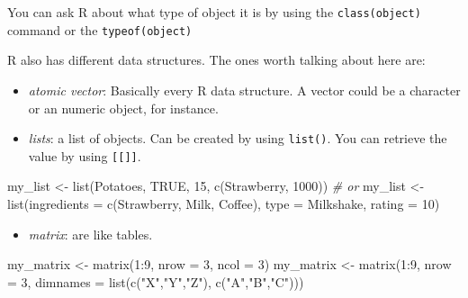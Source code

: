 \documentclass[
]{book}
\newenvironment{Shaded}{\begin{snugshade}}{\end{snugshade}}
\newcommand{\AttributeTok}[1]{\textcolor[rgb]{0.77,0.63,0.00}{#1}}
\newcommand{\CommentTok}[1]{\textcolor[rgb]{0.56,0.35,0.01}{\textit{#1}}}
\newcommand{\ConstantTok}[1]{\textcolor[rgb]{0.00,0.00,0.00}{#1}}
\newcommand{\DecValTok}[1]{\textcolor[rgb]{0.00,0.00,0.81}{#1}}
\newcommand{\FunctionTok}[1]{\textcolor[rgb]{0.00,0.00,0.00}{#1}}
\newcommand{\NormalTok}[1]{#1}
\newcommand{\OtherTok}[1]{\textcolor[rgb]{0.56,0.35,0.01}{#1}}
\newcommand{\SpecialCharTok}[1]{\textcolor[rgb]{0.00,0.00,0.00}{#1}}
\newcommand{\StringTok}[1]{\textcolor[rgb]{0.31,0.60,0.02}{#1}}
\providecommand{\tightlist}{%
  \setlength{\itemsep}{0pt}\setlength{\parskip}{0pt}}
\begin{document}
You can ask R about what type of object it is by using the \texttt{class(object)} command or the \texttt{typeof(object)}

R also has different data structures.
The ones worth talking about here are:

\begin{itemize}
\item
  \emph{atomic vector}: Basically every R data structure.
  A vector could be a character or an numeric object, for instance.
\item
  \emph{lists}: a list of objects.
  Can be created by using \texttt{list()}.
  You can retrieve the value by using \texttt{{[}{[}{]}{]}}.
\end{itemize}

\begin{Shaded}
\begin{Highlighting}[]
\NormalTok{my\_list }\OtherTok{\textless{}{-}} \FunctionTok{list}\NormalTok{(}\StringTok{\textquotesingle{}Potatoes\textquotesingle{}}\NormalTok{, }\ConstantTok{TRUE}\NormalTok{, }\DecValTok{15}\NormalTok{, }\FunctionTok{c}\NormalTok{(}\StringTok{\textquotesingle{}Strawberry\textquotesingle{}}\NormalTok{, }\DecValTok{1000}\NormalTok{))}
\CommentTok{\# or}
\NormalTok{my\_list }\OtherTok{\textless{}{-}} \FunctionTok{list}\NormalTok{(}\AttributeTok{ingredients =} \FunctionTok{c}\NormalTok{(}\StringTok{\textquotesingle{}Strawberry\textquotesingle{}}\NormalTok{, }\StringTok{\textquotesingle{}Milk\textquotesingle{}}\NormalTok{, }\StringTok{\textquotesingle{}Coffee\textquotesingle{}}\NormalTok{), }\AttributeTok{type =} \StringTok{\textquotesingle{}Milkshake\textquotesingle{}}\NormalTok{, }\AttributeTok{rating =} \DecValTok{10}\NormalTok{)}
\end{Highlighting}
\end{Shaded}

\begin{itemize}
\tightlist
\item
  \emph{matrix}: are like tables.
\end{itemize}

\begin{Shaded}
\begin{Highlighting}[]
\NormalTok{my\_matrix }\OtherTok{\textless{}{-}} \FunctionTok{matrix}\NormalTok{(}\DecValTok{1}\SpecialCharTok{:}\DecValTok{9}\NormalTok{, }\AttributeTok{nrow =} \DecValTok{3}\NormalTok{, }\AttributeTok{ncol =} \DecValTok{3}\NormalTok{)}
\NormalTok{my\_matrix }\OtherTok{\textless{}{-}} \FunctionTok{matrix}\NormalTok{(}\DecValTok{1}\SpecialCharTok{:}\DecValTok{9}\NormalTok{, }\AttributeTok{nrow =} \DecValTok{3}\NormalTok{, }\AttributeTok{dimnames =} \FunctionTok{list}\NormalTok{(}\FunctionTok{c}\NormalTok{(}\StringTok{"X"}\NormalTok{,}\StringTok{"Y"}\NormalTok{,}\StringTok{"Z"}\NormalTok{), }\FunctionTok{c}\NormalTok{(}\StringTok{"A"}\NormalTok{,}\StringTok{"B"}\NormalTok{,}\StringTok{"C"}\NormalTok{)))}
\end{Highlighting}
\end{Shaded}
\end{document}
